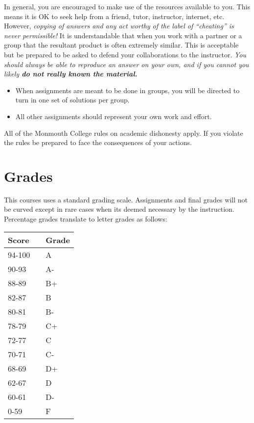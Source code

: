 \documentclass[10pt]{article}
\begin{document}
In general, you are encouraged to make use of the resources available to you.  This means it is OK to seek help from a friend, tutor, instructor, internet, etc.  However, \textit{copying of answers and any act worthy of the label of ``cheating'' is never permissible!}  It is understandable that when you work with a partner or a group that the resultant product is often extremely similar.  This is acceptable but be prepared to be asked to defend your collaborations to the instructor.  \textit{You should always be able to reproduce an answer on your own, and if you cannot you likely \textbf{do not really known the material.}} 
\begin{itemize}
\item When assignments are meant to be done in groups, you will be directed to turn in one set of solutions per group.
\item All other assignments should represent your own work and effort.
\end{itemize}
All of the Monmouth College rules on academic dishonesty apply.  If you violate the rules be prepared to face the consequences of your actions.  

\section{Grades}

This courses uses a standard grading scale.  Assignments and final grades will not be curved except in rare cases when its deemed necessary by the instruction.  Percentage grades translate to letter grades as follows:

\begin{center}
\begin{small}
\begin{tabular}{lcl}
Score & & Grade \\ \hline
94-100 & & A \\
90-93 & & A- \\
88-89 & & B+ \\
82-87 & & B \\
80-81 & & B- \\
78-79 & & C+ \\
72-77 & & C \\
70-71 & & C- \\
68-69 & & D+ \\
62-67 & & D \\
60-61 & & D- \\
0-59 & & F 
\end{tabular}
\end{small}
\end{center}
\end{document}

